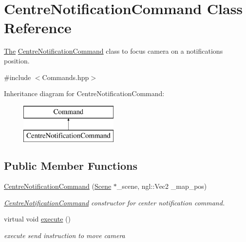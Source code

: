 \hypertarget{class_centre_notification_command}{}\section{Centre\+Notification\+Command Class Reference}
\label{class_centre_notification_command}


\hyperlink{namespace_the}{The} \hyperlink{class_centre_notification_command}{Centre\+Notification\+Command} class to focus camera on a notification\textquotesingle{}s position.  




{\ttfamily \#include $<$Commands.\+hpp$>$}

Inheritance diagram for Centre\+Notification\+Command\+:\begin{figure}[H]
\begin{center}
\leavevmode
\includegraphics[height=2.000000cm]{class_centre_notification_command}
\end{center}
\end{figure}
\subsection*{Public Member Functions}
\begin{DoxyCompactItemize}
\item 
\hyperlink{class_centre_notification_command_a068092ba0fc9365093a83d37830509d8}{Centre\+Notification\+Command} (\hyperlink{class_scene}{Scene} $\ast$\+\_\+scene, ngl\+::\+Vec2 \+\_\+map\+\_\+pos)
\begin{DoxyCompactList}\small\item\em \hyperlink{class_centre_notification_command}{Centre\+Notification\+Command} constructor for center notification command. \end{DoxyCompactList}\item 
\hypertarget{class_centre_notification_command_a41bc06f3dad0bb667c494c313a384eb7}{}virtual void \hyperlink{class_centre_notification_command_a41bc06f3dad0bb667c494c313a384eb7}{execute} ()\label{class_centre_notification_command_a41bc06f3dad0bb667c494c313a384eb7}

\begin{DoxyCompactList}\small\item\em execute send instruction to move camera \end{DoxyCompactList}\end{DoxyCompactItemize}


